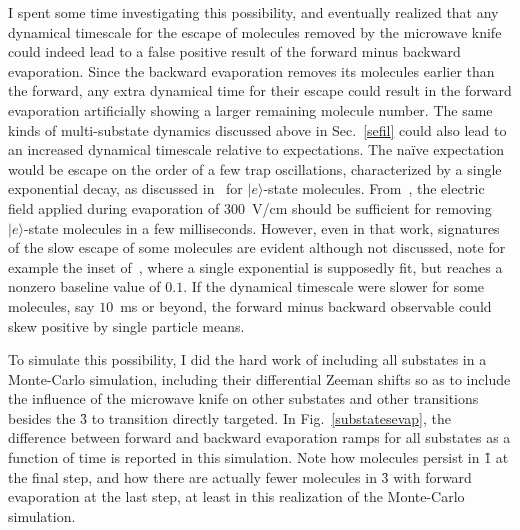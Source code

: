 I spent some time investigating this possibility, and eventually realized that any dynamical timescale for the escape of molecules removed by the microwave knife could indeed lead to a false positive result of the forward minus backward evaporation. 
Since the backward evaporation removes its molecules earlier than the forward, any extra dynamical time for their escape could result in the forward evaporation artificially showing a larger remaining molecule number.
The same kinds of multi-substate dynamics discussed above in Sec.~\ref{sefil} could also lead to an increased dynamical timescale relative to expectations.
The na\"{i}ve expectation would be escape on the order of a few trap oscillations, characterized by a single exponential decay, as discussed in~\cite{Stuhl2012uwave} for $|e\rangle$-state molecules.
From~\citep[Fig.~4]{Stuhl2012uwave}, the electric field applied during evaporation of $300$~V/cm should be sufficient for removing $|e\rangle$-state molecules in a few milliseconds.
However, even in that work, signatures of the slow escape of some molecules are evident although not discussed, note for example the inset of~\citep[Fig.~3]{Stuhl2012uwave}, where a single exponential is supposedly fit, but reaches a nonzero baseline value of $0.1$.
If the dynamical timescale were slower for some molecules, say $10$~ms or beyond, the forward minus backward observable could skew positive by single particle means.

To simulate this possibility, I did the hard work of including all substates in a Monte-Carlo simulation, including their differential Zeeman shifts so as to include the influence of the microwave knife on other substates and other transitions besides the \f3 to  transition directly targeted.
In Fig.~\ref{substatesevap}, the difference between forward and backward evaporation ramps for all substates as a function of time is reported in this simulation.
Note how molecules persist in \f1 at the final step, and how there are actually fewer molecules in \f3 with forward evaporation at the last step, at least in this realization of the Monte-Carlo simulation.


